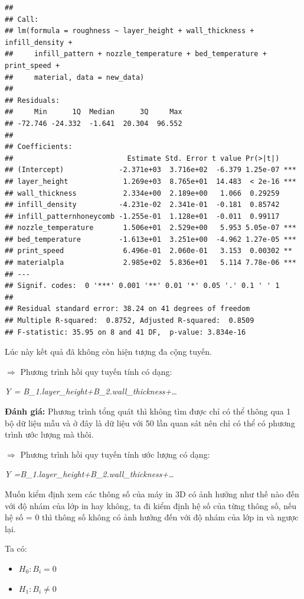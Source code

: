 \begin{verbatim}
## 
## Call:
## lm(formula = roughness ~ layer_height + wall_thickness + infill_density + 
##     infill_pattern + nozzle_temperature + bed_temperature + print_speed + 
##     material, data = new_data)
## 
## Residuals:
##     Min      1Q  Median      3Q     Max 
## -72.746 -24.332  -1.641  20.304  96.552 
## 
## Coefficients:
##                           Estimate Std. Error t value Pr(>|t|)    
## (Intercept)             -2.371e+03  3.716e+02  -6.379 1.25e-07 ***
## layer_height             1.269e+03  8.765e+01  14.483  < 2e-16 ***
## wall_thickness           2.334e+00  2.189e+00   1.066  0.29259    
## infill_density          -4.231e-02  2.341e-01  -0.181  0.85742    
## infill_patternhoneycomb -1.255e-01  1.128e+01  -0.011  0.99117    
## nozzle_temperature       1.506e+01  2.529e+00   5.953 5.05e-07 ***
## bed_temperature         -1.613e+01  3.251e+00  -4.962 1.27e-05 ***
## print_speed              6.496e-01  2.060e-01   3.153  0.00302 ** 
## materialpla              2.985e+02  5.836e+01   5.114 7.78e-06 ***
## ---
## Signif. codes:  0 '***' 0.001 '**' 0.01 '*' 0.05 '.' 0.1 ' ' 1
## 
## Residual standard error: 38.24 on 41 degrees of freedom
## Multiple R-squared:  0.8752, Adjusted R-squared:  0.8509 
## F-statistic: 35.95 on 8 and 41 DF,  p-value: 3.834e-16
\end{verbatim}

Lúc này kết quả đã không còn hiện tượng đa cộng tuyến.

\(\Rightarrow\) Phương trình hồi quy tuyến tính có dạng:

\emph{Y = B\_1.layer\_height+B\_2.wall\_thickness+\ldots{}}

\textbf{Đánh giá:} Phương trình tổng quát thì không tìm được chỉ có thể
thông qua 1 bộ dữ liệu mẫu và ở đây là dữ liệu với 50 lần quan sát nên
chỉ có thể có phương trình ước lượng mà thôi.

\(\Rightarrow\) Phương trình hồi quy tuyến tính ước lượng có dạng:

\emph{Y =B\_1.layer\_height+B\_2.wall\_thickness+\ldots{}}

Muốn kiểm định xem các thông số của máy in 3D có ảnh hưởng như thế nào
đến với độ nhám của lớp in hay không, ta đi kiểm định hệ số của từng
thông số, nếu hệ số = 0 thì thông số không có ảnh hưởng đến với độ nhám
của lớp in và ngược lại.

Ta có:

\begin{itemize}
\item
  \(H_0: B_i=0\)
\item
  \(H_1: B_i≠0\)
\end{itemize}

